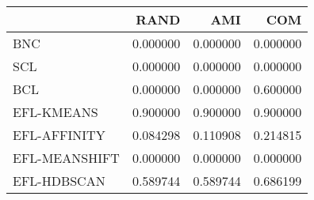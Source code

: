 \begin{tabular}{lrrr}
\toprule
 & RAND & AMI & COM \\
\midrule
BNC & 0.000000 & 0.000000 & 0.000000 \\
SCL & 0.000000 & 0.000000 & 0.000000 \\
BCL & 0.000000 & 0.000000 & 0.600000 \\
EFL-KMEANS & 0.900000 & 0.900000 & 0.900000 \\
EFL-AFFINITY & 0.084298 & 0.110908 & 0.214815 \\
EFL-MEANSHIFT & 0.000000 & 0.000000 & 0.000000 \\
EFL-HDBSCAN & 0.589744 & 0.589744 & 0.686199 \\
\bottomrule
\end{tabular}
